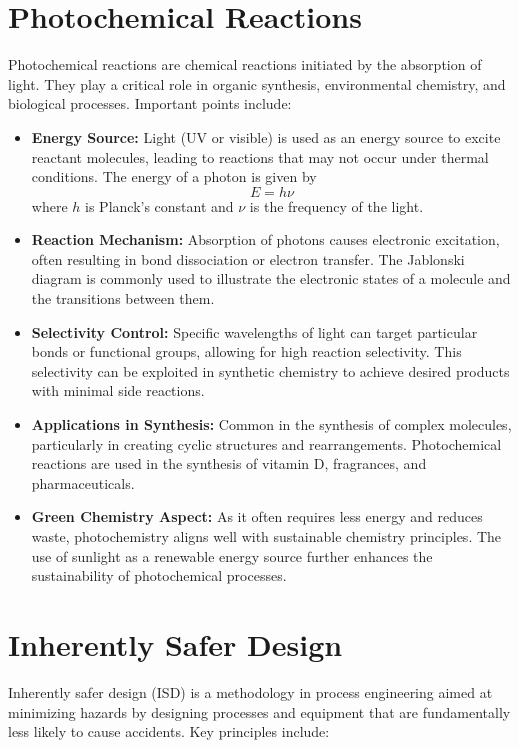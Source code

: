 \documentclass[11pt]{article}
\begin{document}
\section{Photochemical Reactions}
Photochemical reactions are chemical reactions initiated by the absorption of light. They play a critical role in organic synthesis, environmental chemistry, and biological processes. Important points include:

\begin{itemize}
    \item \textbf{Energy Source:} Light (UV or visible) is used as an energy source to excite reactant molecules, leading to reactions that may not occur under thermal conditions. The energy of a photon is given by 
    \[
    E = h\nu
    \]
    where \( h \) is Planck's constant and \( \nu \) is the frequency of the light.
    \item \textbf{Reaction Mechanism:} Absorption of photons causes electronic excitation, often resulting in bond dissociation or electron transfer. The Jablonski diagram is commonly used to illustrate the electronic states of a molecule and the transitions between them.
    \item \textbf{Selectivity Control:} Specific wavelengths of light can target particular bonds or functional groups, allowing for high reaction selectivity. This selectivity can be exploited in synthetic chemistry to achieve desired products with minimal side reactions.
    \item \textbf{Applications in Synthesis:} Common in the synthesis of complex molecules, particularly in creating cyclic structures and rearrangements. Photochemical reactions are used in the synthesis of vitamin D, fragrances, and pharmaceuticals.
    \item \textbf{Green Chemistry Aspect:} As it often requires less energy and reduces waste, photochemistry aligns well with sustainable chemistry principles. The use of sunlight as a renewable energy source further enhances the sustainability of photochemical processes.
\end{itemize}

\section{Inherently Safer Design}
Inherently safer design (ISD) is a methodology in process engineering aimed at minimizing hazards by designing processes and equipment that are fundamentally less likely to cause accidents. Key principles include:
\end{document}
